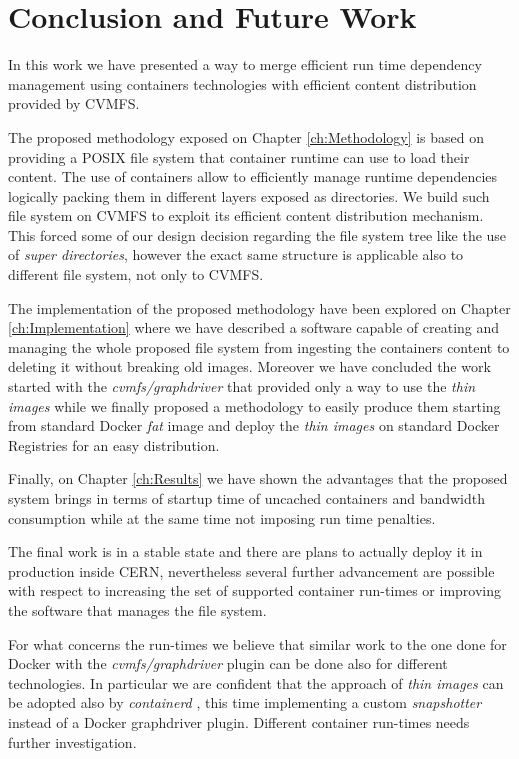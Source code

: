 \chapter{Conclusion and Future Work}\label{ch:FutureWorks}

In this work we have presented a way to merge efficient run time dependency
management using containers technologies with efficient content distribution
provided by CVMFS. 

The proposed methodology exposed on Chapter \ref{ch:Methodology} is based on
providing a POSIX file system that container runtime can use to load their
content. The use of containers allow to efficiently manage runtime dependencies
logically packing them in different layers exposed as directories.  We build
such file system on CVMFS to exploit its efficient content distribution
mechanism. This forced some of our design decision regarding the file system
tree like the use of \textit{super directories}, however the exact same
structure is applicable also to different file system, not only to CVMFS. 

The implementation of the proposed methodology have been explored on Chapter
\ref{ch:Implementation} where we have described a software capable of creating
and managing the whole proposed file system from ingesting the containers
content to deleting it without breaking old images. Moreover we have concluded
the work started with the \textit{cvmfs/graphdriver} that provided only a way
to use the \textit{thin images} while we finally proposed a methodology to
easily produce them starting from standard Docker \textit{fat} image and deploy
the \textit{thin images} on standard Docker Registries for an easy
distribution.

Finally, on Chapter \ref{ch:Results} we have shown the advantages that the
proposed system brings in terms of startup time of uncached containers and
bandwidth consumption while at the same time not imposing run time penalties.

The final work is in a stable state and there are plans to actually deploy it
in production inside CERN, nevertheless several further advancement are
possible with respect to increasing the set of supported container run-times or
improving the software that manages the file system.

For what concerns the run-times we believe that similar work to the one done
for Docker with the \textit{cvmfs/graphdriver} plugin can be done also for
different technologies. In particular we are confident that the approach of
\textit{thin images} can be adopted also by \textit{containerd}
\cite{containerd}, this time implementing a custom \textit{snapshotter} instead
of a Docker graphdriver plugin. Different container run-times needs further
investigation.


